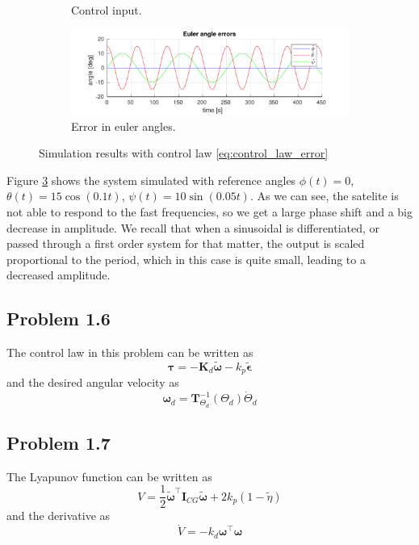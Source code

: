 \begin{figure}[H]
\begin{subfigure}[b]{0.45\textwidth}
		\caption{Control input.}
		\label{fig:5c}
	\end{subfigure}
	\begin{subfigure}[b]{0.45\textwidth}
		\includegraphics[width=\textwidth]{../matlab/1_5_euler_angle_errors}
		\caption{Error in euler angles.}
		\label{fig:5d}
	\end{subfigure}
	\caption{Simulation results with control law \eqref{eq:control_law_error}}\label{fig:error_control_law}
\end{figure}
Figure \ref{fig:error_control_law} shows the system simulated with reference angles $\phi(t) = 0$, $\theta(t) = 15\cos(0.1t)$, $\psi(t) = 10\sin(0.05t)$. As we can see, the satelite is not able to respond to the fast frequencies, so we get a large phase shift and a big decrease in amplitude. We recall that when a sinusoidal is differentiated, or passed through a first order system for that matter, the output is scaled proportional to the period, which in this case is quite small, leading to a decreased amplitude.

\subsection{Problem 1.6}
The control law in this problem can be written as
\begin{equation}
	\boldsymbol{\tau} = -\mathbf{K}_d \tilde{\boldsymbol{\omega}} - k_p \tilde{\boldsymbol{\epsilon}}
\end{equation}
and the desired angular velocity as
\begin{equation}
	\boldsymbol{\omega}_d = \mathbf{T}^{-1}_{\Theta_d}(\Theta_d)\dot{\Theta}_d
\end{equation}

\subsection{Problem 1.7}
The Lyapunov function can be written as
 \begin{equation}
	 V = \frac{1}{2} \tilde{\boldsymbol{\omega}}^{\top} \mathbf{I}_{CG}\tilde{\boldsymbol{\omega}} + 2 k_p (1-\tilde{\eta})
 \end{equation}
and the derivative as
\begin{equation}
	\dot{V} = -k_d \boldsymbol{\omega}^{\top} \boldsymbol{\omega}
\end{equation}


